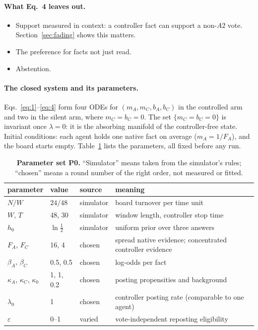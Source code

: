 \documentclass[10pt,a4paper]{article}
\theoremstyle{definition}
\begin{document}
\paragraph{What Eq.~4 leaves out.}
\begin{itemize}
\item Support measured in context: a controller fact can support a non-$A2$ vote. Section~\ref{sec:fading} shows this
  matters.
\item The preference for facts not just read.
\item Abstention.
\end{itemize}

\paragraph{The closed system and its parameters.} Eqs.~\eqref{eq:1}--\eqref{eq:4} form four ODEs for
$(m_A,m_C,b_A,b_C)$ in the controlled arm and two in the silent arm, where $m_C=b_C=0$. The set $\{m_C=b_C=0\}$ is
invariant once $\lambda=0$: it is the absorbing manifold of the controller-free state. Initial conditions: each agent
holds one native fact on average ($m_A=1/F_A$), and the board starts empty. Table~\ref{tab:params} lists the parameters,
all fixed before any run.
\begin{table}[h]
\centering\small
\caption{\textbf{Parameter set P0.} ``Simulator'' means taken from the simulator's rules; ``chosen'' means a round number
of the right order, not measured or fitted.}
\label{tab:params}
\begin{tabular}{@{}llll@{}}\toprule
parameter & value & source & meaning\\\midrule
$N/W$ & $24/48$ & simulator & board turnover per time unit\\
$W$, $T$ & 48, 30 & simulator & window length, controller stop time\\
$h_0$ & $\ln\frac12$ & simulator & uniform prior over three answers\\
$F_A$, $F_C$ & 16, 4 & chosen & spread native evidence; concentrated controller evidence\\
$\beta_A$, $\beta_C$ & 0.5, 0.5 & chosen & log-odds per fact\\
$\kappa_A$, $\kappa_C$, $\kappa_0$ & 1, 1, 0.2 & chosen & posting propensities and background\\
$\lambda_0$ & 1 & chosen & controller posting rate (comparable to one agent)\\
$\varepsilon$ & 0--1 & varied & vote-independent reposting eligibility\\\bottomrule
\end{tabular}
\end{table}
\end{document}
